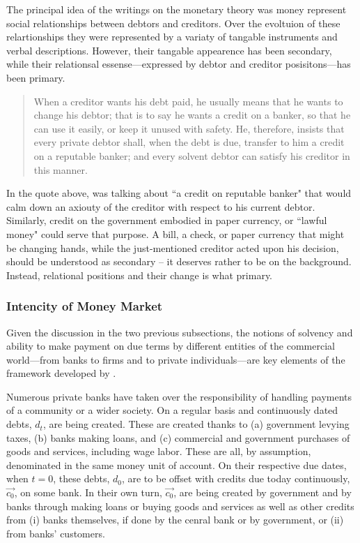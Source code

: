 \begin{figure}[!ht]
  \label{fig:banks_clients_govt2}
  \vspace{.1in}
\end{figure}

The principal idea of the \citeauthor{innes1913} writings on the monetary theory was money represent social relationships between debtors and creditors. Over the evoltuion of these relartionships they were represented by a variaty of tangable instruments and verbal descriptions. However, their tangable appearence has been secondary, while their relationsal essense---expressed by debtor and creditor posisitons---has been primary. 

\begin{quote}
When a creditor wants his debt paid, he usually means that he wants to change his debtor; that is to say he wants a credit on a banker, so that he can use it easily, or keep it unused with safety. He, therefore, insists that every private debtor shall, when the debt is due, transfer to him a credit on a reputable banker; and every solvent debtor can satisfy his creditor in this manner.~\citep[p.~406]{innes1913}
\end{quote}

In the quote above, \citeauthor{innes1913} was talking about ``a credit on reputable banker" that would calm down an axiouty of the creditor with respect to his current debtor. Similarly, credit on the government embodied in paper currency, or ``lawful money" could serve that purpose. A bill, a check, or paper currency that might be changing hands, while the just-mentioned creditor acted upon his decision, should be understood as secondary -- it deserves rather to be on the background. Instead, relational positions and their change is what primary.

\subsubsection{Intencity of Money Market}\label{sec:money_mkt}

Given the discussion in the two previous subsections, the notions of solvency and ability to make payment on due terms by different entities of the commercial world---from banks to firms and to private individuals---are key elements of the framework developed by \citeauthor{innes1913}.

Numerous private banks have taken over the responsibility of handling payments of a community or a wider society. On a regular basis and continuously dated debts, $d_t$, are being created. These are created thanks to (a) government levying taxes, (b) banks making loans, and (c) commercial and government purchases of goods and services, including wage labor. These are all, by assumption, denominated in the same money unit of account. On their respective due dates, when $t=0$, these debts, $d_0$, are to be offset with credits due today continuously, $\overrightarrow{c_0}$, on some bank. In their own turn, $\overrightarrow{c_0}$, are being created by government and by banks through making loans or buying goods and services as well as other credits from (i) banks themselves, if done by the cenral bank or by government, or (ii) from banks' customers. 

